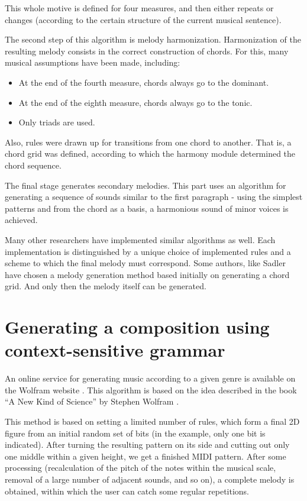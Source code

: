\documentclass[thesis=B,english]{FITthesis}[2019/12/23]
\begin{document}
This whole motive is defined for four measures, and then either repeats or changes (according to the certain structure of the current musical sentence).

The second step of this algorithm is melody harmonization. Harmonization of the resulting melody consists in the correct construction of chords. For this, many musical assumptions have been made, including:
\begin{itemize}
    \item At the end of the fourth measure, chords always go to the dominant.
    \item At the end of the eighth measure, chords always go to the tonic.
    \item Only triads are used.
\end{itemize}
Also, rules were drawn up for transitions from one chord to another. That is, a chord grid was defined, according to which the harmony module determined the chord sequence.

The final stage generates secondary melodies. This part uses an algorithm for generating a sequence of sounds similar to the first paragraph - using the simplest patterns and from the chord as a basis, a harmonious sound of minor voices is achieved.

Many other researchers have implemented similar algorithms as well. Each implementation is distinguished by a unique choice of implemented rules and a scheme to which the final melody must correspond. Some authors, like Sadler \cite{Habr_Sadler} have chosen a melody generation method based initially on generating a chord grid. And only then the melody itself can be generated.

\section{Generating a composition using context-sensitive grammar}

An online service for generating music according to a given genre is available on the Wolfram website \cite{tones_wolfram}. This algorithm is based on the idea described in the book “A New Kind of Science” by Stephen Wolfram \cite{new_kind_of_science}.

This method is based on setting a limited number of rules, which form a final 2D figure from an initial random set of bits (in the example, only one bit is indicated). After turning the resulting pattern on its side and cutting out only one middle within a given height, we get a finished MIDI pattern. After some processing (recalculation of the pitch of the notes within the musical scale, removal of a large number of adjacent sounds, and so on), a complete melody is obtained, within which the user can catch some regular repetitions.
\end{document}
